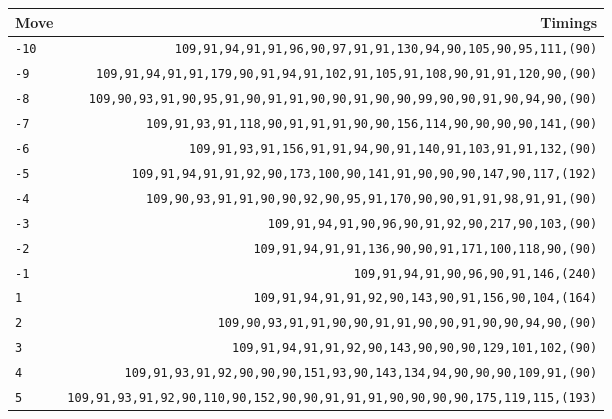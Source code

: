 \begin{table}[!htb]
	\centering
	\begin{tabular}{@{\hskip 0.31cm}L@{\hskip 0.27cm}R@{\hskip 0.34cm}}\toprule
		Move & Timings \\\midrule
		\texttt{-10} & \footnotesize\texttt{109,91,94,91,91,96,90,97,91,91,130,94,90,105,90,95,111,{\color{gray}(90)}}\\
		 \texttt{-9} & \footnotesize\texttt{109,91,94,91,91,179,90,91,94,91,102,91,105,91,108,90,91,91,120,90,{\color{gray}(90)}}\\
		\texttt{-8} & \footnotesize\texttt{109,90,93,91,90,95,91,90,91,91,90,90,91,90,90,99,90,90,91,90,94,90,{\color{gray}(90)}}\\
		 \texttt{-7} & \footnotesize\texttt{109,91,93,91,118,90,91,91,91,90,90,156,114,90,90,90,90,141,{\color{gray}(90)}}\\
		\texttt{-6} & \footnotesize\texttt{109,91,93,91,156,91,91,94,90,91,140,91,103,91,91,132,{\color{gray}(90)}}\\
		 \texttt{-5} & \footnotesize\texttt{109,91,94,91,91,92,90,173,100,90,141,91,90,90,90,147,90,117,{\color{gray}(192)}}\\
		\texttt{-4} & \footnotesize\texttt{109,90,93,91,91,90,90,92,90,95,91,170,90,90,91,91,98,91,91,{\color{gray}(90)}}\\
		 \texttt{-3} & \footnotesize\texttt{109,91,94,91,90,96,90,91,92,90,217,90,103,{\color{gray}(90)}}\\
		\texttt{-2} & \footnotesize\texttt{109,91,94,91,91,136,90,90,91,171,100,118,90,{\color{gray}(90)}}\\
		 \texttt{-1} & \footnotesize\texttt{109,91,94,91,90,96,90,91,146,{\color{gray}(240)}}\\\midrule
		\texttt{1} & \footnotesize\texttt{109,91,94,91,91,92,90,143,90,91,156,90,104,{\color{gray}(164)}}\\
		 \texttt{2} & \footnotesize\texttt{109,90,93,91,91,90,90,91,91,90,90,91,90,90,94,90,{\color{gray}(90)}}\\
		\texttt{3} & \footnotesize\texttt{109,91,94,91,91,92,90,143,90,90,90,129,101,102,{\color{gray}(90)}}\\
		 \texttt{4} & \footnotesize\texttt{109,91,93,91,92,90,90,90,151,93,90,143,134,94,90,90,90,109,91,{\color{gray}(90)}}\\
		\texttt{5} & \footnotesize\texttt{109,91,93,91,92,90,110,90,152,90,90,91,91,91,90,90,90,90,175,119,115,{\color{gray}(193)}}\\

\end{tabular}
\end{table}
